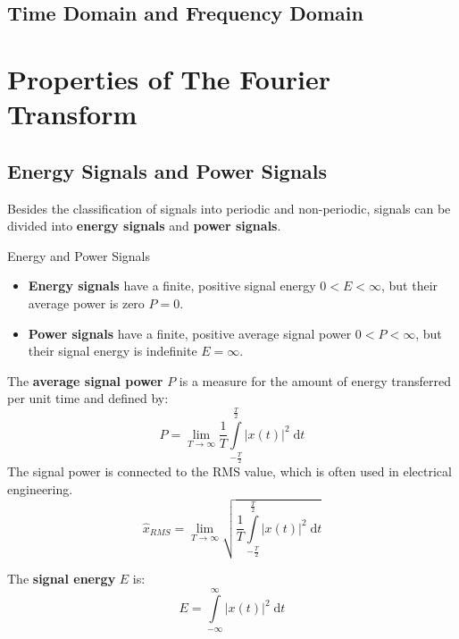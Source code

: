 \begin{refsection}
\subsection{Time Domain and Frequency Domain}

\section{Properties of The Fourier Transform}

\subsection{Energy Signals and Power Signals}

Besides the classification of signals into periodic and non-periodic, signals can be divided into  \textbf{energy signals} and  \textbf{power signals}.

\begin{definition}{Energy and Power Signals}
	\begin{itemize}
		\item \textbf{Energy signals} have a finite, positive signal energy $0 < E < \infty$, but their average power is zero $P = 0$.
		\item \textbf{Power signals} have a finite, positive average signal power $0 < P < \infty$, but their signal energy is indefinite $E = \infty$.
	\end{itemize}
\end{definition}

The  \textbf{average signal power} $P$ is a measure for the amount of energy transferred per unit time and defined by:
\begin{equation}
	P = \lim\limits_{T \rightarrow \infty} \frac{1}{T} \int\limits_{-\frac{T}{2}}^{\frac{T}{2}} \left|x(t)\right|^2 \; \mathrm{d} t
\end{equation}
The signal power is connected to the \ac{RMS} value, which is often used in electrical engineering.
\begin{equation}
	\hat{x}_{RMS} = \lim\limits_{T \rightarrow \infty} \sqrt{ \frac{1}{T} \int\limits_{-\frac{T}{2}}^{\frac{T}{2}} \left|x(t)\right|^2 \; \mathrm{d} t}
\end{equation}

The  \textbf{signal energy} $E$ is:
\begin{equation}
	E = \int\limits_{-\infty}^{\infty} \left|x(t)\right|^2 \; \mathrm{d} t
\end{equation}


\end{refsection}
